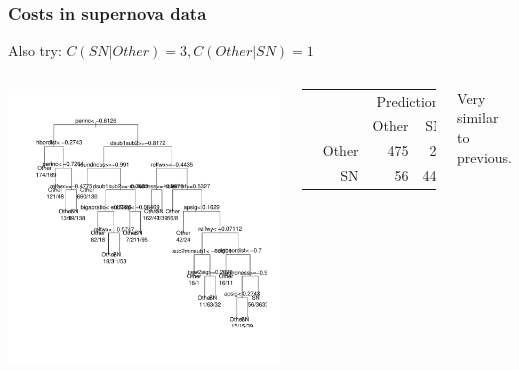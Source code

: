\documentclass{beamer}
\begin{document}
\begin{frame}
	\frametitle{Costs in supernova data}
	Also try: $C(SN|Other)=3, C(Other|SN)=1$
	\begin{columns}[c] 
			\includegraphics{treec2.pdf}
				\begin{table}
				\begin{tabular}{cr|rr}
				& & \multicolumn{2}{c}{Prediction}\\
				& & Other & SN\\
				\hline
				\multirow{2}{*}{\rotatebox{90}{Actual}} & Other &  475 &  25\\
				& SN & 56 &  444\\
				\end{tabular}
				\end{table}	
				Very similar to previous.
			\end{columns}
\end{frame}
\end{document}
